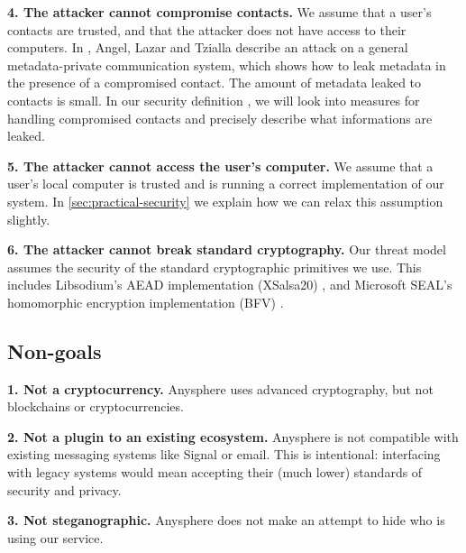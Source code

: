 \textbf{4. The attacker cannot compromise contacts.} We assume that a user's contacts are trusted, and that the attacker does not have access to their computers. In \cite{angel2018s}, Angel, Lazar and Tzialla describe an attack on a general metadata-private communication system, which shows how to leak metadata in the presence of a compromised contact. The amount of metadata leaked to contacts is small. In our security definition \cite{LAZ22SecDef}, we will look into measures for handling compromised contacts and precisely describe what informations are leaked.

\textbf{5. The attacker cannot access the user's computer.} We assume that a user's local computer is trusted and is running a correct implementation of our system. In \cref{sec:practical-security} we explain how we can relax this assumption slightly.

\textbf{6. The attacker cannot break standard cryptography.} Our threat model assumes the security of the standard cryptographic primitives we use. This includes Libsodium's AEAD implementation (XSalsa20) \cite{libsodium}, and Microsoft SEAL's homomorphic encryption implementation (BFV) \cite{sealcrypto}.

\subsection{Non-goals}
\textbf{1. Not a cryptocurrency.} Anysphere uses advanced cryptography, but not blockchains or cryptocurrencies.

\textbf{2. Not a plugin to an existing ecosystem.} Anysphere is not compatible with existing messaging systems like Signal or email. This is intentional: interfacing with legacy systems would mean accepting their (much lower) standards of security and privacy.

\textbf{3. Not steganographic.} Anysphere does not make an attempt to hide who is using our service.

